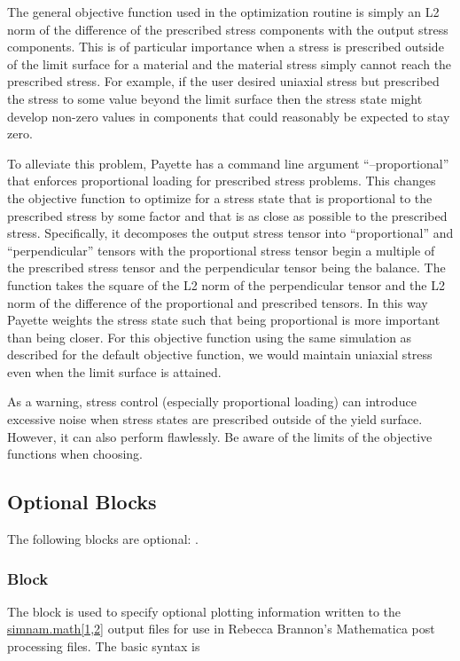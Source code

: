 \documentclass[11pt]{article}
\newcommand{\mathpltblock}{\Purple{\texttt{mathplot}}}
\begin{document}
The general objective function used in the optimization routine is simply an L2
norm of the difference of the prescribed stress components with the output stress
components. This is of particular importance when a stress is prescribed outside
of the limit surface for a material and the material stress simply cannot reach
the prescribed stress. For example, if the user desired uniaxial stress but
prescribed the stress to some value beyond the limit surface then the stress
state might develop non-zero values in components that could reasonably be
expected to stay zero.

To alleviate this problem, Payette has a command line argument ``--proportional''
that enforces proportional loading for prescribed stress problems. This changes
the objective function to optimize for a stress state that is proportional to the
prescribed stress by some factor and that is as close as possible to the
prescribed stress. Specifically, it decomposes the output stress tensor into
``proportional'' and ``perpendicular'' tensors with the proportional stress
tensor begin a multiple of the prescribed stress tensor and the perpendicular
tensor being the balance. The function takes the square of the L2 norm of the
perpendicular tensor and the L2 norm of the difference of the proportional and
prescribed tensors. In this way Payette weights the stress state such that being
proportional is more important than being closer. For this objective function
using the same simulation as described for the default objective function, we
would maintain uniaxial stress even when the limit surface is attained.

As a warning, stress control (especially proportional loading) can introduce
excessive noise when stress states are prescribed outside of the yield surface.
However, it can also perform flawlessly. Be aware of the limits of the objective
functions when choosing.

\subsection{Optional Blocks}
The following blocks are optional: \mathpltblock{}.

\subsubsection{\mathpltblock{} Block}
The \mathpltblock{} block is used to specify optional plotting information
written to the \url{simnam.math[1,2]} output files for use in Rebecca Brannon's
Mathematica post processing files. The basic syntax is
\end{document}
